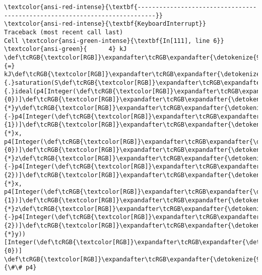 \documentclass[11pt]{article}
\begin{document}
    \begin{Verbatim}[commandchars=\\\{\}, frame=single, framerule=2mm, rulecolor=\color{outerrorbackground}]
\textcolor{ansi-red-intense}{\textbf{---------------------------------------------------------------------------}}
\textcolor{ansi-red-intense}{\textbf{KeyboardInterrupt}}                         Traceback (most recent call last)
Cell \textcolor{ansi-green-intense}{\textbf{In[111], line 6}}
\textcolor{ansi-green}{      4} kJ \def\tcRGB{\textcolor[RGB]}\expandafter\tcRGB\expandafter{\detokenize{98,98,98}}{=} kJ\def\tcRGB{\textcolor[RGB]}\expandafter\tcRGB\expandafter{\detokenize{98,98,98}}{.}saturation(S\def\tcRGB{\textcolor[RGB]}\expandafter\tcRGB\expandafter{\detokenize{98,98,98}}{.}ideal(p4[Integer(\def\tcRGB{\textcolor[RGB]}\expandafter\tcRGB\expandafter{\detokenize{98,98,98}}{0})]\def\tcRGB{\textcolor[RGB]}\expandafter\tcRGB\expandafter{\detokenize{98,98,98}}{*}y\def\tcRGB{\textcolor[RGB]}\expandafter\tcRGB\expandafter{\detokenize{98,98,98}}{-}p4[Integer(\def\tcRGB{\textcolor[RGB]}\expandafter\tcRGB\expandafter{\detokenize{98,98,98}}{1})]\def\tcRGB{\textcolor[RGB]}\expandafter\tcRGB\expandafter{\detokenize{98,98,98}}{*}x, p4[Integer(\def\tcRGB{\textcolor[RGB]}\expandafter\tcRGB\expandafter{\detokenize{98,98,98}}{0})]\def\tcRGB{\textcolor[RGB]}\expandafter\tcRGB\expandafter{\detokenize{98,98,98}}{*}z\def\tcRGB{\textcolor[RGB]}\expandafter\tcRGB\expandafter{\detokenize{98,98,98}}{-}p4[Integer(\def\tcRGB{\textcolor[RGB]}\expandafter\tcRGB\expandafter{\detokenize{98,98,98}}{2})]\def\tcRGB{\textcolor[RGB]}\expandafter\tcRGB\expandafter{\detokenize{98,98,98}}{*}x, p4[Integer(\def\tcRGB{\textcolor[RGB]}\expandafter\tcRGB\expandafter{\detokenize{98,98,98}}{1})]\def\tcRGB{\textcolor[RGB]}\expandafter\tcRGB\expandafter{\detokenize{98,98,98}}{*}z\def\tcRGB{\textcolor[RGB]}\expandafter\tcRGB\expandafter{\detokenize{98,98,98}}{-}p4[Integer(\def\tcRGB{\textcolor[RGB]}\expandafter\tcRGB\expandafter{\detokenize{98,98,98}}{2})]\def\tcRGB{\textcolor[RGB]}\expandafter\tcRGB\expandafter{\detokenize{98,98,98}}{*}y))[Integer(\def\tcRGB{\textcolor[RGB]}\expandafter\tcRGB\expandafter{\detokenize{98,98,98}}{0})] \def\tcRGB{\textcolor[RGB]}\expandafter\tcRGB\expandafter{\detokenize{95,135,135}}{\#\# p4}

\end{Verbatim}
\end{document}
